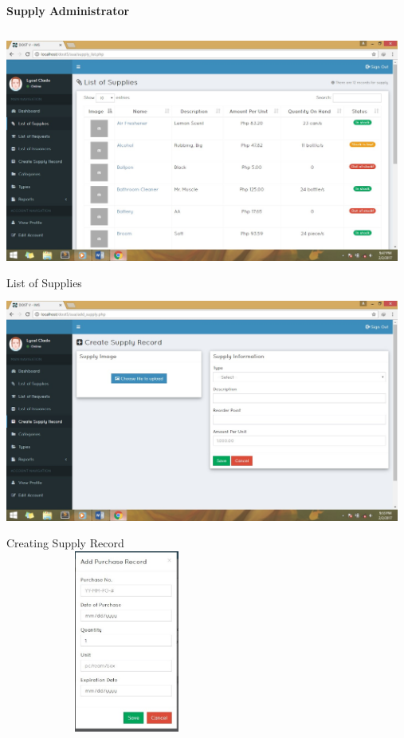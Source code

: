 \begin{center}
\begin{flushleft}
	\textbf{Supply Administrator}
\end{flushleft}	

\begin{center}
	\includegraphics[width=13cm,height=8cm]{image/d3-6.jpg}\\
	List of Supplies \\
	\vspace{1.5cm}
	\includegraphics[width=13cm,height=8cm]{image/d3-7.jpg}\\
	Creating Supply Record\\
	\vspace{1.5cm}
	\includegraphics[width=8cm,height=6cm]{image/d3-8.jpg}\\

\end{center}
\end{center}
